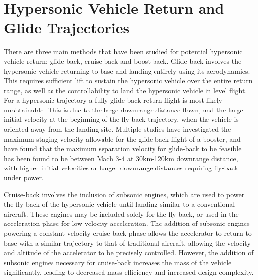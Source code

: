 \section{Hypersonic Vehicle Return and Glide Trajectories}





There are three main methods that have been studied for potential hypersonic vehicle return; glide-back, cruise-back and boost-back. Glide-back involves the hypersonic vehicle returning to base and landing entirely using its aerodynamics. This requires sufficient lift to sustain the hypersonic vehicle over the entire return range, as well as the controllability to land the hypersonic vehicle in level flight. 
For a hypersonic trajectory a fully glide-back return flight is most likely unobtainable. This is due to the large downrange distance flown, and the large initial velocity at the beginning of the fly-back trajectory, when the vehicle is oriented away from the landing site. Multiple studies have investigated the maximum staging velocity allowable for the glide-back flight of a booster, and have found that the maximum separation velocity for glide-back to be feasible has been found to be between Mach 3-4 at 30km-120km downrange distance, with higher initial velocities or longer downrange distances requiring fly-back under power\cite{Hellman,Tetlow1992}.

Cruise-back involves the inclusion of subsonic engines, which are used to power the fly-back of the hypersonic vehicle until landing similar to a conventional aircraft. These engines may be included solely for the fly-back\cite{Hellman}, or used in the acceleration phase for low velocity acceleration\cite{Mehta2001,Tetlow1992,Wilhite1991}. The addition of subsonic engines powering a constant velocity cruise-back phase allows the accelerator to return to base with a similar trajectory to that of traditional aircraft, allowing the velocity and altitude of the accelerator to be precisely controlled. However, the addition of subsonic engines necessary for cruise-back increases the mass of the vehicle significantly, leading to decreased mass efficiency and increased design complexity\cite{Hellman}. 

